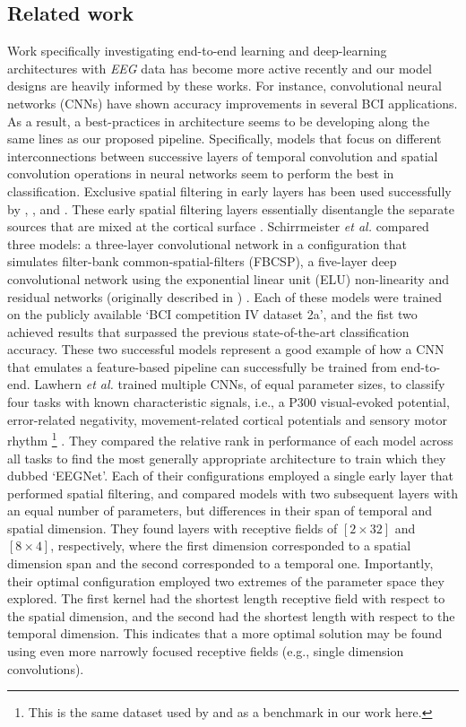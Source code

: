 \documentclass[utf8]{frontiersSCNS} %
\begin{document}
\subsection{Related work}

Work specifically investigating end-to-end learning and deep-learning architectures with \emph{EEG} data has become more active recently and our model designs are heavily informed by these works. For instance, convolutional neural networks (CNNs) have shown accuracy improvements in several BCI applications. As a result, a best-practices in architecture seems to be developing along the same lines as our proposed pipeline. Specifically, models that focus on different interconnections between successive layers of temporal convolution and spatial convolution operations in neural networks seem to perform the best in classification. Exclusive spatial filtering in early layers has been used successfully by \cite{Lawhern2017}, \cite{Sun}, and \cite{Schirrmeister2017}. These early spatial filtering layers essentially disentangle the separate sources that are mixed at the cortical surface \cite{ElectricFieldsOfTheBrain_ch5and6}. Schirrmeister {\em et al.} compared three models: a three-layer convolutional network in a configuration that simulates filter-bank common-spatial-filters (FBCSP), a five-layer deep convolutional network using the exponential linear unit (ELU) non-linearity \cite{Clevert} and residual networks (originally described in \cite{He2015a}) \cite{Schirrmeister2017}. Each of these models were trained on the publicly available `BCI competition IV dataset 2a', and the fist two achieved results that surpassed the previous state-of-the-art classification accuracy. These two successful models represent a good example of how a CNN that emulates a feature-based pipeline can successfully be trained from end-to-end. Lawhern {\em et al.} trained multiple CNNs, of equal parameter sizes, to classify four tasks with known characteristic signals, i.e., a P300 visual-evoked potential, error-related negativity, movement-related cortical potentials and sensory motor rhythm \footnote{This is the same dataset used by \cite{Schirrmeister2017} and as a benchmark in our work here.} \cite{Lawhern2017}. They compared the relative rank in performance of each model across all tasks to find the most generally appropriate architecture to train which they dubbed `EEGNet'. Each of their configurations employed a single early layer that performed spatial filtering, and compared models with two subsequent layers with an equal number of parameters, but differences in their span of temporal and spatial dimension. They found layers with receptive fields of $[2 \times 32]$ and $[8 \times 4]$, respectively, where the first dimension corresponded to a spatial dimension span and the second corresponded to a temporal one. Importantly, their optimal configuration employed two extremes of the parameter space they explored. The first kernel had the shortest length receptive field with respect to the spatial dimension, and the second had the shortest length with respect to the temporal dimension. This indicates that a more optimal solution may be found using even more narrowly focused receptive fields (e.g., single dimension convolutions).
\end{document}
